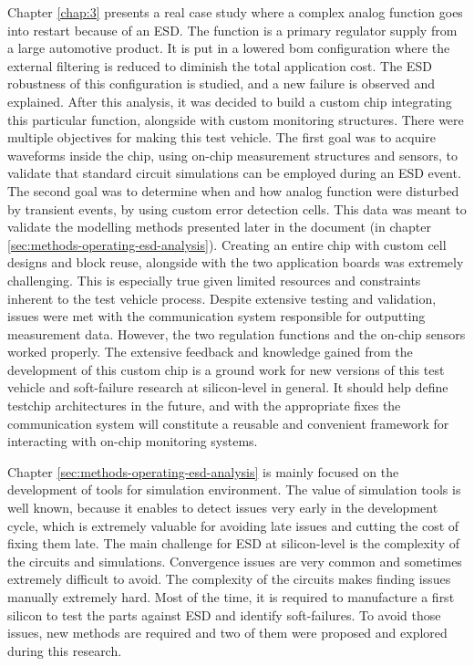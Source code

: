 Chapter \ref{chap:3} presents a real case study where a complex analog function goes into restart because of an ESD.
The function is a primary regulator supply from a large automotive product.
It is put in a lowered \gls{bom} configuration where the external filtering is reduced to diminish the total application cost.
The ESD robustness of this configuration is studied, and a new failure is observed and explained.
After this analysis, it was decided to build a custom chip integrating this particular function, alongside with custom monitoring structures.
There were multiple objectives for making this test vehicle.
The first goal was to acquire waveforms inside the chip, using on-chip measurement structures and sensors, to validate that standard circuit simulations can be employed during an ESD event.
The second goal was to determine when and how analog function were disturbed by transient events, by using custom error detection cells.
This data was meant to validate the modelling methods presented later in the document (in chapter \ref{sec:methods-operating-esd-analysis}).
Creating an entire chip with custom cell designs and block reuse, alongside with the two application boards was extremely challenging.
This is especially true given limited resources and constraints inherent to the test vehicle process.
Despite extensive testing and validation, issues were met with the communication system responsible for outputting measurement data.
However, the two regulation functions and the on-chip sensors worked properly.
The extensive feedback and knowledge gained from the development of this custom chip is a ground work for new versions of this test vehicle and soft-failure research at silicon-level in general.
It should help define testchip architectures in the future, and with the appropriate fixes the communication system will constitute a reusable and convenient framework for interacting with on-chip monitoring systems.

Chapter \ref{sec:methods-operating-esd-analysis} is mainly focused on the development of tools for simulation environment.
The value of simulation tools is well known, because it enables to detect issues very early in the development cycle, which is extremely valuable for avoiding late issues and cutting the cost of fixing them late.
The main challenge for ESD at silicon-level is the complexity of the circuits and simulations.
Convergence issues are very common and sometimes extremely difficult to avoid.
The complexity of the circuits makes finding issues manually extremely hard.
Most of the time, it is required to manufacture a first silicon to test the parts against ESD and identify soft-failures.
To avoid those issues, new methods are required and two of them were proposed and explored during this research.


